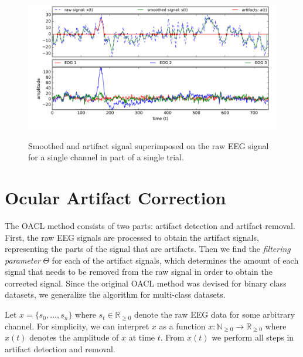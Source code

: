\begin{figure}%
	\centering
	\includegraphics[width=1\textwidth]{figures/oacl-signals.png}
	\vspace{-2em}
	\label{fig:oacl-signals}
	\caption{Smoothed and artifact signal superimposed on the raw EEG signal for a single channel in part of a single trial.}
\end{figure}
\section{Ocular Artifact Correction}\label{sec:oacl}
The OACL method consists of two parts: artifact detection and artifact removal. First, the raw EEG signals are processed to obtain the artifact signals, representing the parts of the signal that are artifacts. Then we find the \emph{filtering parameter} $\Theta$ for each of the artifact signals, which determines the amount of each signal that needs to be removed from the raw signal in order to obtain the corrected signal. 
Since the original OACL method \citep{li2015ocular} was devised for binary class datasets, we generalize the algorithm for multi-class datasets. 

Let $x = \{s_0, ...,s_n\}$ where $s_t \in \mathbb{R}_{\geq 0}$ denote the raw EEG data for some arbitrary channel. For simplicity, we can interpret $x$ as a function $x : \mathbb{N}_{\geq 0} \rightarrow \mathbb{R}_{\geq 0}$ where $x(t)$ denotes the amplitude of $x$ at time $t$. 
From $x(t)$ we perform all steps in artifact detection and removal.


